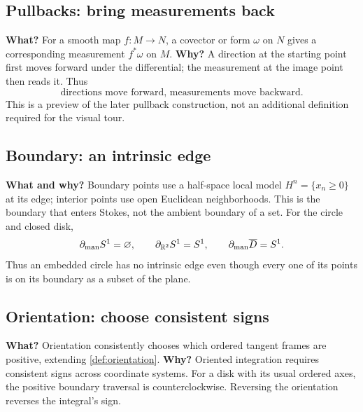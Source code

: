 \subsection*{Pullbacks: bring measurements back}
\textbf{What?} For a smooth map $f:M\to N$, a covector or form $\omega$
on $N$ gives a corresponding measurement $f^*\omega$ on $M$.
\textbf{Why?} A direction at the starting point first moves forward under
the differential; the measurement at the image point then reads it.
Thus
\[
\boxed{\text{directions move forward, measurements move backward}.}
\]
This is a preview of the later pullback construction, not an additional
definition required for the visual tour.

\subsection*{Boundary: an intrinsic edge}
\textbf{What and why?} Boundary points use a half-space local model
$H^n=\{x_n\geq0\}$ at its edge; interior points use open Euclidean neighborhoods.
This is the boundary that enters Stokes, not the ambient boundary of a set.
For the circle and closed disk,
\[
\partial_{\mathrm{man}}S^1=\varnothing,\qquad
\partial_{\mathbb{R}^2}S^1=S^1,\qquad
\partial_{\mathrm{man}}\overline D=S^1.
\]
Thus an embedded circle has no intrinsic edge even though every one of its
points is on its boundary as a subset of the plane.


\subsection*{Orientation: choose consistent signs}
\textbf{What?} Orientation consistently chooses which ordered tangent
frames are positive, extending \cref{def:orientation}. \textbf{Why?}
Oriented integration requires consistent signs across coordinate systems.
For a disk with its usual ordered axes, the positive boundary traversal is
counterclockwise. Reversing the orientation reverses the integral's sign.
\begin{center}
\end{center}

